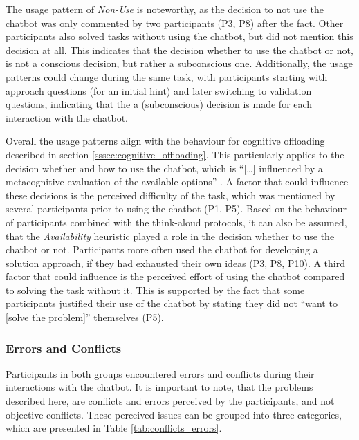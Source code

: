 The usage pattern of \textit{Non-Use} is noteworthy, as the decision to not use the chatbot was only commented by two participants (P3, P8) after the fact. Other participants also solved tasks without using the chatbot, but did not mention this decision at all. This indicates that the decision whether to use the chatbot or not, is not a conscious decision, but rather a subconscious one. Additionally, the usage patterns could change during the same task, with participants starting with approach questions (for an initial hint) and later switching to validation questions, indicating that the a (subconscious) decision is made for each interaction with the chatbot.

Overall the usage patterns align with the behaviour for cognitive offloading described in section \ref{sssec:cognitive_offloading}. This particularly applies to the decision whether and how to use the chatbot, which is “[\dots] influenced by a metacognitive evaluation of the available options” \parencite{Risko2015}. A factor that could influence these decisions is the perceived difficulty of the task, which was mentioned by several participants prior to using the chatbot (P1, P5). Based on the behaviour of participants combined with the think-aloud protocols, it can also be assumed, that the \textit{Availability} heuristic \parencite{Tversky1974} played a role in the decision whether to use the chatbot or not. Participants more often used the chatbot for developing a solution approach, if they had exhausted their own ideas (P3, P8, P10). A third factor that could influence is the perceived effort of using the chatbot compared to solving the task without it. This is supported by the fact that some participants justified their use of the chatbot by stating they did not “want to [solve the problem]” themselves (P5).

\subsubsection{Errors and Conflicts} \label{sssec:errors_conflicts}

Participants in both groups encountered errors and conflicts during their interactions with the chatbot. It is important to note, that the problems described here, are conflicts and errors perceived by the participants, and not objective conflicts. These perceived issues can be grouped into three categories, which are presented in Table \ref{tab:conflicts_errors}.


